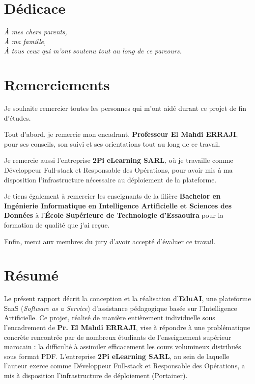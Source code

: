\documentclass[12pt, a4paper, oneside]{report}
\begin{document}
\hypersetup{pageanchor=false}

\chapter*{Dédicace}
\vspace{2cm}
\begin{center}
\textit{À mes chers parents,\\
À ma famille,\\
À tous ceux qui m'ont soutenu tout au long de ce parcours.}
\end{center}
\newpage

\chapter*{Remerciements}

Je souhaite remercier toutes les personnes qui m'ont aidé durant ce projet de fin d'études.

Tout d'abord, je remercie mon encadrant, \textbf{Professeur El Mahdi ERRAJI}, pour ses conseils, son suivi et ses orientations tout au long de ce travail.

Je remercie aussi l'entreprise \textbf{2Pi eLearning SARL}, où je travaille comme Développeur Full-stack et Responsable des Opérations, pour avoir mis à ma disposition l'infrastructure nécessaire au déploiement de la plateforme.

Je tiens également à remercier les enseignants de la filière \textbf{Bachelor en Ingénierie Informatique en Intelligence Artificielle et Sciences des Données} à l'\textbf{École Supérieure de Technologie d'Essaouira} pour la formation de qualité que j'ai reçue.

Enfin, merci aux membres du jury d'avoir accepté d'évaluer ce travail.

\newpage

\chapter*{Résumé}

Le présent rapport décrit la conception et la réalisation d'\textbf{EduAI}, une plateforme SaaS (\textit{Software as a Service}) d'assistance pédagogique basée sur l'Intelligence Artificielle. Ce projet, réalisé de manière entièrement individuelle sous l'encadrement de \textbf{Pr. El Mahdi ERRAJI}, vise à répondre à une problématique concrète rencontrée par de nombreux étudiants de l'enseignement supérieur marocain : la difficulté à assimiler efficacement les cours volumineux distribués sous format PDF. L'entreprise \textbf{2Pi eLearning SARL}, au sein de laquelle l'auteur exerce comme Développeur Full-stack et Responsable des Opérations, a mis à disposition l'infrastructure de déploiement (Portainer).
\end{document}
